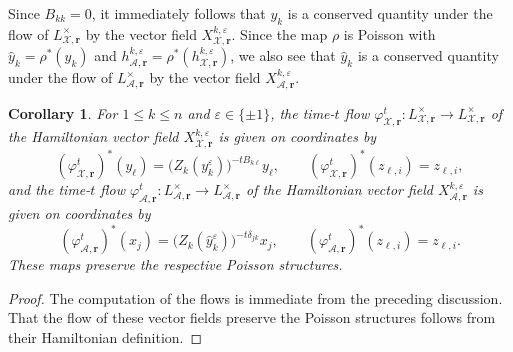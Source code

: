 \documentclass{amsart}
\newtheorem{corollary}[theorem]{Corollary}
\numberwithin{equation}{section}
\newcommand{\bfr}{{\boldsymbol{r}}}
\newcommand{\cA}{\mathcal{A}}
\newcommand{\cX}{\mathcal{X}}
\begin{document}
Since $B_{kk}=0$, it immediately follows that $y_k$ is a conserved quantity under the flow of $L^\times_{\cX,\bfr}$ by the vector field $X_{\cX,\bfr}^{k,\varepsilon}$.
Since the map $\rho$ is Poisson with $\hat y_k=\rho^*(y_k)$ and $h_{\cA,\bfr}^{k,\varepsilon}=\rho^*(h_{\cX,\bfr}^{k,\varepsilon})$, we also see that $\hat y_k$ is a conserved quantity under the flow of $L^\times_{\cA,\bfr}$ by the vector field $X_{\cA,\bfr}^{k,\varepsilon}$.
\begin{corollary}
  \label{cor:time-one flows}
  For $1\le k\le n$ and $\varepsilon\in\{\pm1\}$, the time-$t$ flow $\varphi_{\cX,\bfr}^t:L^\times_{\cX,\bfr}\to L^\times_{\cX,\bfr}$ of the Hamiltonian vector field $X_{\cX,\bfr}^{k,\varepsilon}$ is given on coordinates by
  \[(\varphi_{\cX,\bfr}^t)^*(y_\ell)=\big(Z_k(y_k^\varepsilon)\big)^{-tB_{k\ell}}y_\ell,\qquad (\varphi_{\cX,\bfr}^t)^*(z_{\ell,i})=z_{\ell,i},\]
  and the time-$t$ flow $\varphi_{\cA,\bfr}^t:L^\times_{\cA,\bfr}\to L^\times_{\cA,\bfr}$ of the Hamiltonian vector field $X_{\cA,\bfr}^{k,\varepsilon}$ is given on coordinates by
  \[(\varphi_{\cA,\bfr}^t)^*(x_j)=\big(Z_k(\hat y_k^\varepsilon)\big)^{-t\delta_{jk}}x_j,\qquad (\varphi_{\cA,\bfr}^t)^*(z_{\ell,i})=z_{\ell,i}.\]
  These maps preserve the respective Poisson structures.
\end{corollary}
\begin{proof}
  The computation of the flows is immediate from the preceding discussion.
  That the flow of these vector fields preserve the Poisson structures follows from their Hamiltonian definition.
\end{proof}
\end{document}
